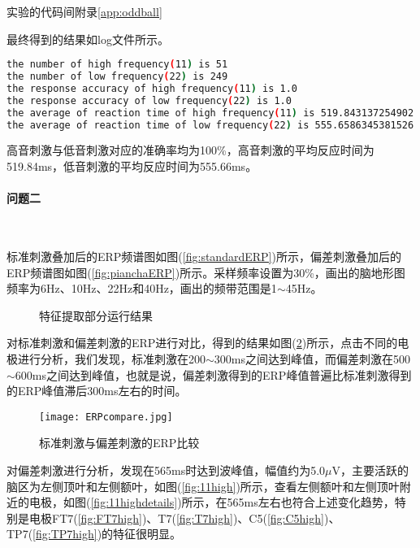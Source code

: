 \documentclass{hitreport}
\begin{document}
实验的代码间附录\ref{app:oddball}

最终得到的结果如log文件所示。
\begin{lstlisting}[language=bash]
the number of high frequency(11) is 51
the number of low frequency(22) is 249
the response accuracy of high frequency(11) is 1.0
the response accuracy of low frequency(22) is 1.0
the average of reaction time of high frequency(11) is 519.843137254902
the average of reaction time of low frequency(22) is 555.6586345381526
\end{lstlisting}


高音刺激与低音刺激对应的准确率均为100\%，高音刺激的平均反应时间为519.84ms，低音刺激的平均反应时间为555.66ms。

\paragraph{问题二}~{}

标准刺激叠加后的ERP频谱图如图(\ref{fig:standardERP})所示，偏差刺激叠加后的ERP频谱图如图(\ref{fig:pianchaERP})所示。采样频率设置为30\%，画出的脑地形图频率为6Hz、10Hz、22Hz和40Hz，画出的频带范围是1$\sim$45Hz。

\begin{figure}[htb]
	\centering
	\hspace{5pt}
	\caption{特征提取部分运行结果}\label{fig:feature}
\end{figure}

对标准刺激和偏差刺激的ERP进行对比，得到的结果如图(\ref{fig:ERPcompare})所示，点击不同的电极进行分析，我们发现，标准刺激在200$\sim$300ms之间达到峰值，而偏差刺激在500$\sim$600ms之间达到峰值，也就是说，偏差刺激得到的ERP峰值普遍比标准刺激得到的ERP峰值滞后300ms左右的时间。

\begin{figure}[htb]
\centering
\texttt{[image: ERPcompare.jpg]}
\caption{标准刺激与偏差刺激的ERP比较}\label{fig:ERPcompare}
\end{figure}

对偏差刺激进行分析，发现在565ms时达到波峰值，幅值约为5.0$\mu$V，主要活跃的脑区为左侧顶叶和左侧额叶，如图(\ref{fig:11high})所示，查看左侧额叶和左侧顶叶附近的电极，如图(\ref{fig:11highdetails})所示，在565ms左右也符合上述变化趋势，特别是电极FT7(\ref{fig:FT7high})、T7(\ref{fig:T7high})、C5(\ref{fig:C5high})、TP7(\ref{fig:TP7high})的特征很明显。
\end{document}

